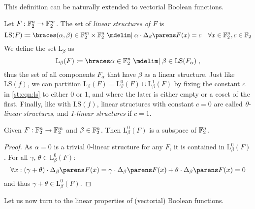 This definition can be naturally extended to vectorial Boolean functions.
\begin{definition}
    Let $F : \mathbb{F}_2^n \to \mathbb{F}_2^m$.
    The set of \emph{linear structures of $F$} is
    \begin{equation}\label{st:eqn:ls}
        \mathrm{LS}(F) \coloneqq \set{(\alpha, \beta) \in \F_2^m \times \F_2^n \given \iprod{\alpha}{\derive{\beta}{F}(x)} = c \quad \forall x \in \F_2^n, c \in \F_2}
    \end{equation}
    We define the set $\mathrm{L}_\beta$ as
    \begin{equation*}
        \mathrm{L}_\beta(F) \coloneqq \set{\alpha \in \F_2^n \given \beta \in \mathrm{LS}(F_\alpha)}\;,
    \end{equation*}
    thus the set of all components $F_\alpha$ that have $\beta$ as a linear structure.
    Just like $\mathrm{LS}(f)$, we can partition $\mathrm{L}_\beta(F) = \mathrm{L}_\beta^0(F) \cup \mathrm{L}_\beta^1(F)$ by fixing the constant $c$ in \cref{st:eqn:ls} to either 0 or 1, and where the later is either empty or a coset of the first.
    Finally, like with $\mathrm{LS}(f)$, linear structures with constant $c = 0$ are called \emph{0-linear structures}, and \emph{1-linear structures} if $c=1$.
\end{definition}

\begin{lemma}
    Given $F : \mathbb{F}_2^n \to \mathbb{F}_2^m$ and $\beta \in \mathbb{F}_2^n$.
    Then $\mathrm{L}_\beta^0(F)$ is a subspace of $\mathbb{F}_2^n$.
\end{lemma}
\begin{proof}
      As $\alpha = 0$ is a trivial 0-linear structure for any $F$, it is contained in $\mathrm{L}_\beta^0(F)$.
      For all $\gamma$, $\theta \in \mathrm{L}_\beta^0(F)$:
      \begin{equation*}
          \forall x : \iprod{(\gamma + \theta)}{\derive{\beta}{F}(x)} = \iprod{\gamma}{\derive{\beta}{F}(x)} + \iprod{\theta}{\derive{\beta}{F}(x)} = 0
      \end{equation*}
      and thus $\gamma + \theta \in \mathrm{L}_\beta^0(F)$.
\end{proof}

Let us now turn to the linear properties of (vectorial) Boolean functions.

